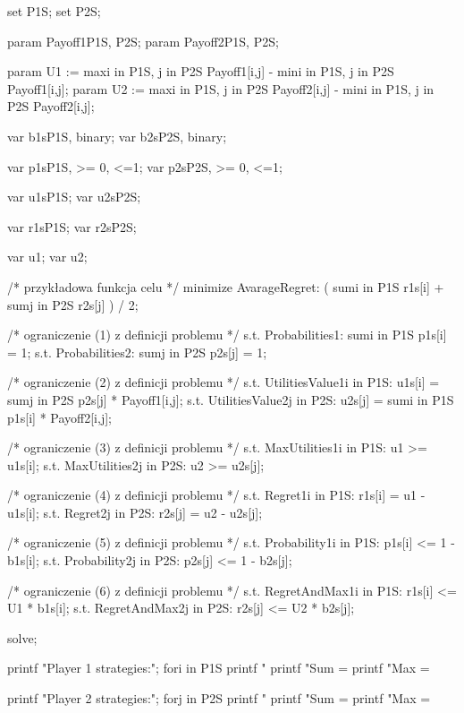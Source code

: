 \documentclass[polish]{standalone}
\begin{document}
\begin{code}[caption=Szukanie rozwiązania]
set P1S;
set P2S;

param Payoff1{P1S, P2S};
param Payoff2{P1S, P2S};

param U1 := max{i in P1S, j in P2S}
  Payoff1[i,j] - min{i in P1S, j in P2S} Payoff1[i,j];
param U2 := max{i in P1S, j in P2S}
  Payoff2[i,j] - min{i in P1S, j in P2S} Payoff2[i,j];

var b1s{P1S}, binary;
var b2s{P2S}, binary;

var p1s{P1S}, >= 0, <=1;
var p2s{P2S}, >= 0, <=1;

var u1s{P1S};
var u2s{P2S};

var r1s{P1S};
var r2s{P2S};

var u1;
var u2;

/* przykładowa funkcja celu */
minimize AvarageRegret:
  ( sum{i in P1S} r1s[i] + sum{j in P2S} r2s[j] ) / 2;

/* ograniczenie (1) z definicji problemu */
s.t. Probabilities1:
	sum{i in P1S} p1s[i] = 1;
s.t. Probabilities2:
	sum{j in P2S} p2s[j] = 1;

/* ograniczenie (2) z definicji problemu */
s.t. UtilitiesValue1{i in P1S}:
	u1s[i] = sum{j in P2S} p2s[j] * Payoff1[i,j];
s.t. UtilitiesValue2{j in P2S}:
	u2s[j] = sum{i in P1S} p1s[i] * Payoff2[i,j];

/* ograniczenie (3) z definicji problemu */
s.t. MaxUtilities1{i in P1S}:
	u1 >= u1s[i];
s.t. MaxUtilities2{j in P2S}:
	u2 >= u2s[j];

/* ograniczenie (4) z definicji problemu */
s.t. Regret1{i in P1S}:
	r1s[i] = u1 - u1s[i];
s.t. Regret2{j in P2S}:
	r2s[j] = u2 - u2s[j];

/* ograniczenie (5) z definicji problemu */
s.t. Probability1{i in P1S}:
	p1s[i] <= 1 - b1s[i];
s.t. Probability2{j in P2S}:
	p2s[j] <= 1 - b2s[j];

/* ograniczenie (6) z definicji problemu */
s.t. RegretAndMax1{i in P1S}:
	r1s[i] <= U1 * b1s[i];
s.t. RegretAndMax2{j in P2S}:
	r2s[j] <= U2 * b2s[j];

solve;
 
printf "Player 1 strategies:\n";
for{i in P1S}
	printf "%
printf "Sum = %
printf "Max = %
 
printf "Player 2 strategies:\n";
for{j in P2S}
	printf "%
printf "Sum = %
printf "Max = %
\end{code}
\end{document}
